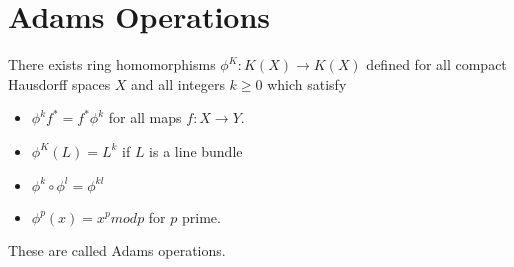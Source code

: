 \documentclass[../Thesis.tex]{subfiles}
\begin{document}
\section{Adams Operations}
\begin{theorem}
There exists ring homomorphisms $\phi^K: K(X) \rightarrow K(X)$ defined for all compact Hausdorff spaces $X$ and all integers $k \geq 0$ which satisfy
\begin{itemize}
\item $\phi^k f^* = f^* \phi^k$ for all maps $f : X \rightarrow Y$.
\item $\phi^K(L) = L^k$ if $L$ is a line bundle
\item $\phi^k\circ\phi^l = \phi^{kl}$
\item $\phi^p (x) = x^p mod p$ for $p$ prime.
\end{itemize}
These are called Adams operations.
\end{theorem}
\end{document}
